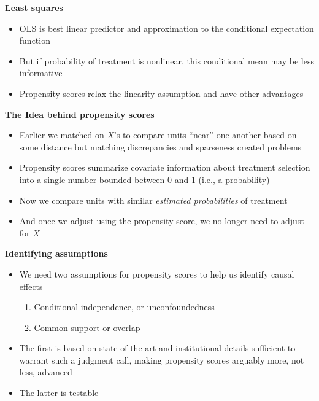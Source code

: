 \documentclass[notes=show]{beamer}
\begin{document}
\begin{frame}[plain]
	\begin{center}
	\textbf{Least squares}
	\end{center}
	
	\begin{itemize}
	\item OLS is best linear predictor and approximation to the conditional expectation function 
	\item But if probability of treatment is nonlinear, this conditional mean may be less informative
	\item Propensity scores relax the linearity assumption and have other advantages
	\end{itemize}
\end{frame}



\begin{frame}[plain]
	\begin{center}
	\textbf{The Idea behind propensity scores}
	\end{center}
	
	\begin{itemize}
	\item Earlier we matched on $X$'s to compare units ``near'' one another based on some distance but matching discrepancies and sparseness created problems
	\item Propensity scores summarize covariate information about treatment selection into a single number bounded between 0 and 1 (i.e., a probability)
	\item Now we compare units with similar \emph{estimated probabilities} of treatment
	\item And once we adjust using the propensity score, we no longer need to adjust for $X$
	\end{itemize}
\end{frame}

\begin{frame}[plain]
\begin{center}
\textbf{Identifying assumptions}
\end{center}

\begin{itemize}
\item We need two assumptions for propensity scores to help us identify causal effects
	\begin{enumerate}
	\item Conditional independence, or unconfoundedness
	\item Common support or overlap
	\end{enumerate}
\item The first is based on state of the art and institutional details sufficient to warrant such a judgment call, making propensity scores arguably more, not less, advanced
\item The latter is testable
\end{itemize}

\end{frame}
\end{document}
